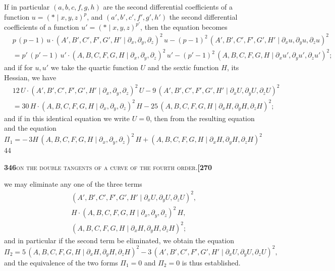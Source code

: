 \documentclass[11pt]{article}
\newcommand{\Cdel}{\mid}
\begin{document}
\noindent If in particular $(a, b, c, f, g, h)$ are the second differential coefficients of a function $u = (*\Cdel x, y, z)^p$, and $(a', b', c', f', g', h')$ the second differential coefficients of a function $u' = (*\Cdel x, y, z)^{p'}$, then the equation becomes
\[
\begin{aligned}
   &p\,(p - 1)\,u\cdot(A', B', C', F', G', H'\Cdel\partial_x,\partial_y,\partial_z)^2\,u - (p - 1)^2\,(A', B', C', F', G', H'\Cdel\partial_x u,\partial_y u,\partial_z u)^2\\
   &= p'\,(p' - 1)\,u'\cdot(A, B, C, F, G, H\Cdel\partial_x,\partial_y,\partial_z)^2\,u' - (p' - 1)^2\,(A, B, C, F, G, H\Cdel\partial_x u',\partial_y u',\partial_z u')^2;
\end{aligned}
\]
and if for $u, u'$ we take the quartic function $U$ and the sextic function $H$, its Hessian, we have
\[
\begin{aligned}
   &12\,U\cdot(A', B', C', F', G', H'\Cdel\partial_x,\partial_y,\partial_z)^2\,U - 9\,(A', B', C', F', G', H'\Cdel\partial_x U,\partial_y U,\partial_z U)^2\\
   &= 30\,H\cdot(A, B, C, F, G, H\Cdel\partial_x,\partial_y,\partial_z)^2\,H - 25\,(A, B, C, F, G, H\Cdel\partial_x H,\partial_y H,\partial_z H)^2;
\end{aligned}
\]
and if in this identical equation we write $U = 0$, then from the resulting equation and the equation
\[
   \Pi_1 = -\,3 H\,(A, B, C, F, G, H\Cdel\partial_x,\partial_y,\partial_z)^2\,H + (A, B, C, F, G, H\Cdel\partial_x H,\partial_y H,\partial_z H)^2
\]
\hfill 44

\newpage
\setcounter{page}{346}

\noindent\textbf{346}\hfill\textsc{on the double tangents of a curve of the fourth order.}\hfill\textbf{[270}

\medskip

\noindent we may eliminate any one of the three terms
\[
\begin{aligned}
   &(A', B', C', F', G', H'\Cdel\partial_x U,\partial_y U,\partial_z U)^2,\\
   &H\cdot(A, B, C, F, G, H\Cdel\partial_x,\partial_y,\partial_z)^2\,H,\\
   &(A, B, C, F, G, H\Cdel\partial_x H,\partial_y H,\partial_z H)^2;
\end{aligned}
\]
and in particular if the second term be eliminated, we obtain the equation
\[
   \Pi_2 = 5\,(A, B, C, F, G, H\Cdel\partial_x H,\partial_y H,\partial_z H)^2 - 3\,(A', B', C', F', G', H'\Cdel\partial_x U,\partial_y U,\partial_z U)^2,
\]
and the equivalence of the two forms $\Pi_1 = 0$ and $\Pi_2 = 0$ is thus established.
\end{document}
